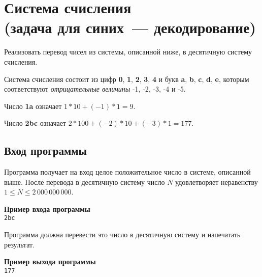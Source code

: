 \documentclass[a4paper,10pt]{article}
\begin{document}
\section*{Система счисления\\
(задача для синих~--- декодирование)}

Реализовать перевод чисел из системы, описанной ниже, в десятичную систему счисления.

Система счисления состоит из цифр \textbf{0}, \textbf{1}, \textbf{2}, \textbf{3}, \textbf{4} и букв \textbf{a}, \textbf{b}, \textbf{c}, \textbf{d}, \textbf{e}, которым соответствуют \textit{отрицательные величины} -1, -2, -3, -4 и -5.

Число \textbf{1a} означает $1 * 10 + (-1) * 1 = 9$.

Число \textbf{2bc} означает $2 * 100 + (-2) * 10 + (-3) * 1 = 177$. 

\subsection*{Вход программы}

Программа получает на вход целое положительное число в системе, описанной выше.
После перевода в десятичную систему число $N$ удовлетворяет неравенству $1 \leq N \leq 2\,000\,000\,000$.

\noindent\textbf{Пример входа программы}\\
\texttt{2bc}

Программа должна перевести это число в десятичную систему и напечатать результат.

\noindent\textbf{Пример выхода программы}\\
\texttt{177}
\end{document}
